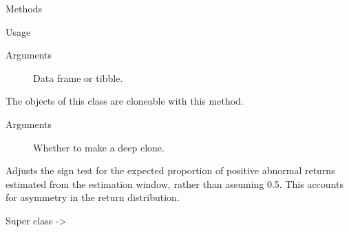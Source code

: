 \documentclass[a4paper]{book}
\begin{document}
\begin{Section}{Methods}
\begin{SubSection}{}
\begin{SubSubSection}{Usage}
\end{SubSubSection}

%
\begin{SubSubSection}{Arguments}

\begin{description}

\item[] Data frame or tibble.

\end{description}



\end{SubSubSection}

\end{SubSection}




\hypertarget{method-GARCHModel-clone}{}
%
\begin{SubSection}{}
The objects of this class are cloneable with this method.
%

%
\begin{SubSubSection}{Arguments}

\begin{description}

\item[] Whether to make a deep clone.

\end{description}



\end{SubSubSection}

\end{SubSection}


\end{Section}
%
\begin{Description}
Adjusts the sign test for the expected proportion of positive abnormal
returns estimated from the estimation window, rather than assuming 0.5.
This accounts for asymmetry in the return distribution.
\end{Description}
%
\begin{Section}{Super class}
 -> 
\end{Section}
\end{document}
